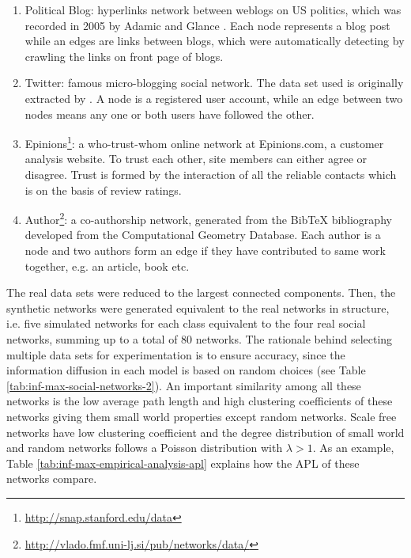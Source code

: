 		\begin{enumerate}
			\item Political Blog: hyperlinks network between weblogs on US politics, which was recorded in 2005 by Adamic and Glance \cite{adamic2005}. Each node represents a blog post while an edges are links between blogs, which were automatically detecting by crawling the links on front page of blogs.
			
			\item Twitter: famous micro-blogging social network. The data set used is originally extracted by \cite{hashmi2012}. A node is a registered user account, while an edge between two nodes means any one or both users have followed the other.
			
			\item Epinions\footnote{\url{http://snap.stanford.edu/data}}: a who-trust-whom online network at Epinions.com, a customer analysis website. To trust each other, site members can either agree or disagree. Trust is formed by the interaction of all the reliable contacts which is on the basis of review ratings.
			
			\item Author\footnote{\url{http://vlado.fmf.uni-lj.si/pub/networks/data/}}: a co-authorship network, generated from the BibTeX bibliography developed from the Computational Geometry Database. Each author is a node and two authors form an edge if they have contributed to same work together, e.g. an article, book etc.
		\end{enumerate}
		
		The real data sets were reduced to the largest connected components. Then, the synthetic networks were generated equivalent to the real networks in structure, i.e. five simulated networks for each class equivalent to the four real social networks, summing up to a total of 80 networks. The rationale behind selecting multiple data sets for experimentation is to ensure accuracy, since the information diffusion in each model is based on random choices (see Table \ref{tab:inf-max-social-networks-2}). An important similarity among all these networks is the low average path length and high clustering coefficients of these networks giving them small world properties except random networks. Scale free networks have low clustering coefficient and the degree distribution of small world and random networks follows a Poisson distribution with $\lambda >1$. As an example, Table \ref{tab:inf-max-empirical-analysis-apl} explains how the APL of these networks compare.
		
